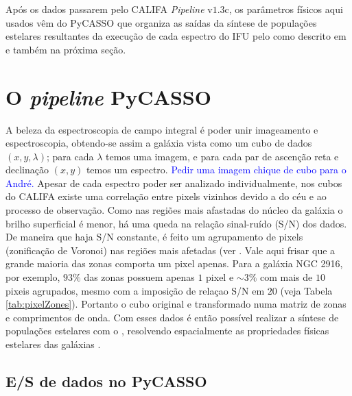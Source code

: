 Após os dados passarem pelo CALIFA {\em Pipeline} v$1.3$c, os parâmetros físicos
aqui usados vêm do PyCASSO que organiza as saídas da síntese de populações
estelares resultantes da execução de cada espectro do IFU pelo \starlight
\citep{CidFernandes2005} como descrito em \citet{CidFernandes2013a} e também na
próxima seção.


\section{O {\em pipeline} PyCASSO}
\label{sec:CALePyC:PyCASSO}

A beleza da espectroscopia de campo integral é poder unir imageamento e
espectroscopia, obtendo-se assim a galáxia vista como um cubo de dados  $(x, y,
\lambda)$; para cada $\lambda$ temos uma imagem, e para cada par de ascenção
reta e declinação $(x, y)$ temos um espectro. \ojo \textcolor{blue}{Pedir uma
imagem chique de cubo para o André.} Apesar de cada espectro poder ser analizado
individualmente, nos cubos do CALIFA existe uma correlação entre pixels vizinhos
devido a  do céu e ao processo de observação. Como nas regiões
mais afastadas do núcleo da galáxia o brilho superficial é menor, há uma queda
na relação sinal-ruído (S/N) dos dados. De maneira que haja S/N constante, é
feito um agrupamento de pixels (zonificação de Voronoi) nas regiões mais
afetadas (ver \citep[][sec. 3]{CidFernandes2013a}. Vale aqui frisar que a grande
maioria das zonas comporta um pixel apenas. Para a galáxia NGC 2916, por
exemplo, $93\%$ das zonas possuem apenas $1$ pixel e $\sim 3\%$ com mais de $10$
pixeis agrupados, mesmo com a imposição de relaçao S/N em $20$ (veja Tabela
\ref{tab:pixelZones}). Portanto o cubo original e transformado numa matriz de
zonas e comprimentos de onda. Com esses dados é então possível realizar a
síntese de populações estelares com o \starlight, resolvendo espacialmente as
propriedades físicas estelares das galáxias \citep{CidFernandes2013a,
CidFernandes2013b, GonzalezDelgado2013}.

\subsection{E/S de dados no PyCASSO}

